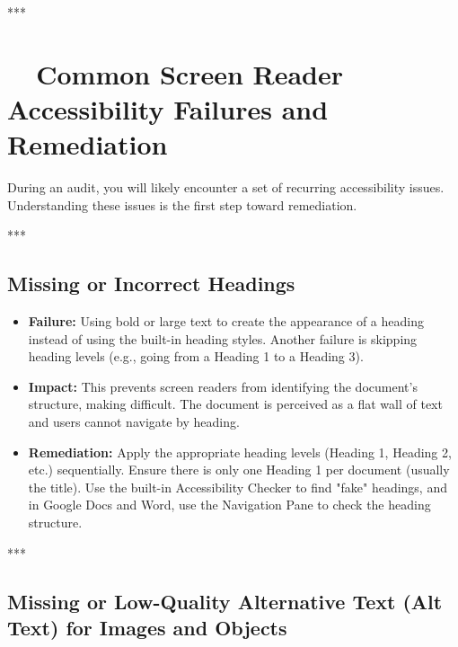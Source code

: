 ***

\section{~~Common Screen Reader Accessibility Failures and Remediation}
\label{sec:common-screen-reader-accessibility-failures-and-remediation}

During an audit, you will likely encounter a set of recurring accessibility issues. Understanding these issues is the first step toward remediation.

***

\subsection{Missing or Incorrect Headings}
\label{sub:missing-or-incorrect-headings}

\begin{itemize}
	\item \textbf{Failure:} Using bold or large text to create the appearance of a heading instead of using the built-in heading styles. Another failure is skipping heading levels (e.g., going from a Heading 1 to a Heading 3).
	\item \textbf{Impact:} This prevents screen readers from identifying the document's structure, making  difficult. The document is perceived as a flat wall of text and users cannot navigate by heading.
	\item \textbf{Remediation:} Apply the appropriate heading levels (Heading 1, Heading 2, etc.) sequentially. Ensure there is only one Heading 1 per document (usually the title). Use the built-in Accessibility Checker to find "fake" headings, and in Google Docs and Word, use the Navigation Pane to check the heading structure.
\end{itemize}

***

\subsection{Missing or Low-Quality Alternative Text (Alt Text) for Images and Objects}
\label{sub:missing-or-low-quality-alternative-text-alt-text-for-images-and-objects}

